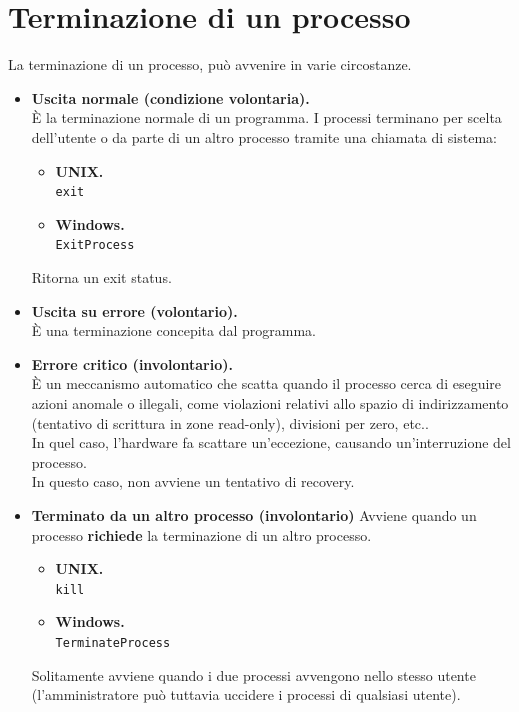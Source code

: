 \documentclass{report}
\begin{document}
\newpage

\section{Terminazione di un processo}

La terminazione di un processo, può avvenire in varie circostanze.

\begin{itemize}
    \item \textbf{Uscita normale (condizione volontaria).}\\
    È la terminazione normale di un programma. I processi terminano per scelta dell'utente o da parte di un altro processo tramite una chiamata di sistema:
\begin{itemize}
    \item \textbf{UNIX.}\\
    \verb|exit|
    \item \textbf{Windows.}\\
    \verb|ExitProcess|
\end{itemize}

Ritorna un exit status.

\item \textbf{Uscita su errore (volontario).}\\
È una terminazione concepita dal programma.

\item \textbf{Errore critico (involontario).}\\
È un meccanismo automatico che scatta quando il processo cerca di eseguire azioni anomale o illegali, come violazioni relativi allo spazio di indirizzamento (tentativo di scrittura in zone read-only), divisioni per zero, etc..\\ In quel caso, l'hardware fa scattare un'eccezione, causando un'interruzione del processo.\\
In questo caso, non avviene un tentativo di recovery.

\item \textbf{Terminato da un altro processo (involontario)}
Avviene quando un processo \textbf{richiede} la terminazione di un altro processo.
\begin{itemize}
    \item \textbf{UNIX.}\\
    \verb|kill|
    \item \textbf{Windows.}\\
    \verb|TerminateProcess|
\end{itemize}
Solitamente avviene quando i due processi avvengono nello stesso utente \\(l'amministratore può tuttavia uccidere i processi di qualsiasi utente).

\end{itemize}
\end{document}

